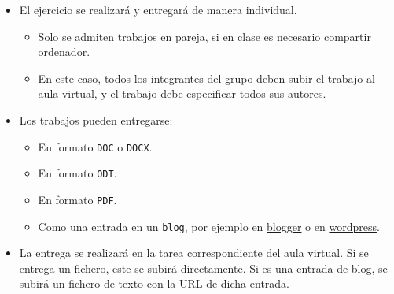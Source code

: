 \documentclass[a4paper]{article}
\begin{document}
\begin{itemize}
\item El ejercicio se realizará y entregará de manera individual.

\begin{itemize}
\item Solo se admiten trabajos en pareja, si en clase es necesario compartir ordenador.
\item En este caso, todos los integrantes del grupo deben subir el trabajo al aula virtual, y el trabajo debe especificar todos sus autores.
\end{itemize}
\end{itemize}


\begin{itemize}
\item Los trabajos pueden entregarse:
\begin{itemize}
\item En formato \texttt{DOC} o \texttt{DOCX}.
\item En formato \texttt{ODT}.
\item En formato \texttt{PDF}.
\item Como una entrada en un \texttt{blog}, por ejemplo en \href{https://www.blogger.com/}{blogger} o en \href{https://wordpress.com/es/}{wordpress}.
\end{itemize}
\end{itemize}


\begin{itemize}
\item La entrega se realizará en la tarea correspondiente del aula virtual. Si se entrega un fichero, este se subirá directamente. Si es una entrada de blog, se subirá un fichero de texto con la URL de dicha entrada.
\end{itemize}
\end{document}
